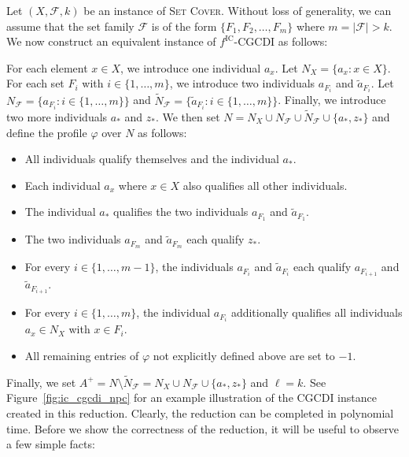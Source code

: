 \documentclass[
    12pt,               %
    a4paper,            %
    bibtotoc,           %
    pointlessnumbers,   %
    ngerman,            %
    titlepage,          %
    leqno,              %
    ]{scrarticle}       %
\newcommand\figref{Figure~\ref}
\begin{document}
\begin{Proof}
Let $(X, \mathcal{F}, k)$ be an instance of \textsc{Set Cover}. Without loss of generality, we can assume that the set family $\mathcal{F}$ is of the form $\{ F_1, F_2, \ldots, F_m \}$ where $m = |\mathcal{F}| > k$. We now construct an equivalent instance of $f^{\text{IC}}$-CGCDI as follows:

For each element $x \in X$, we introduce one individual $a_x$. Let $N_X = \{ a_x : x \in X \}$. For each set $F_i$ with $i \in \{ 1, \ldots, m \}$, we introduce two individuals $a_{F_i}$ and $\tilde{a}_{F_i}$. Let $N_\mathcal{F} = \big\{ a_{F_i} : i \in \{ 1, \ldots, m \} \big\}$ and $\tilde{N}_\mathcal{F} = \big\{ \tilde{a}_{F_i} : i \in \{ 1, \ldots, m \} \big\}$. Finally, we introduce two more individuals $a_\ast$ and $z_\ast$. We then set $N = N_X \cup N_\mathcal{F} \cup \tilde{N}_\mathcal{F} \cup \{ a_\ast, z_\ast \}$ and define the profile $\varphi$ over $N$ as follows:

\begin{itemize}[nolistsep]
\item
All individuals qualify themselves and the individual $a_\ast$.
\item
Each individual $a_x$ where $x \in X$ also qualifies all other individuals.
\item
The individual $a_\ast$ qualifies the two individuals $a_{F_1}$ and $\tilde{a}_{F_1}$.
\item
The two individuals $a_{F_m}$ and $\tilde{a}_{F_m}$ each qualify $z_\ast$.
\item
For every $i \in \{ 1, \ldots, m-1 \}$, the individuals $a_{F_i}$ and $\tilde{a}_{F_i}$ each qualify $a_{F_{i+1}}$ and $\tilde{a}_{F_{i+1}}$.
\item
For every $i \in \{ 1, \ldots, m \}$, the individual $a_{F_i}$ additionally qualifies all individuals $a_x \in N_X$ with $x \in F_i$.
\item
All remaining entries of $\varphi$ not explicitly defined above are set to $-1$.
\end{itemize}

Finally, we set $A^+ = N \setminus \tilde{N}_\mathcal{F} = N_X \cup N_\mathcal{F} \cup \{ a_\ast, z_\ast \}$ and $\ell = k$. See \figref{fig:ic_cgcdi_npc} for an example illustration of the CGCDI instance created in this reduction. Clearly, the reduction can be completed in polynomial time. Before we show the correctness of the reduction, it will be useful to observe a few simple facts:




\end{Proof}
\end{document}

